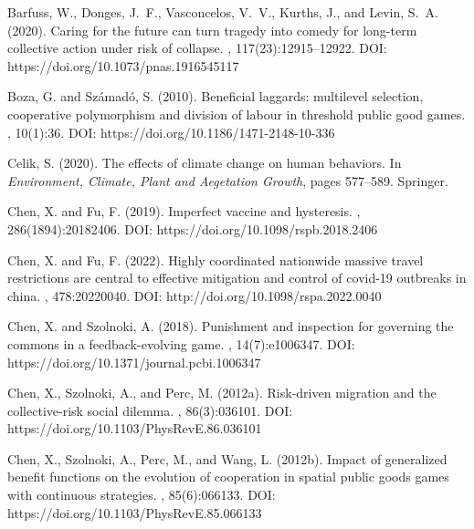 \documentclass[9pt]{elife}
\begin{document}
\begin{thebibliography}{}

Barfuss, W., Donges, J.~F., Vasconcelos, V.~V., Kurths, J., and Levin, S.~A.
  (2020).
\newblock Caring for the future can turn tragedy into comedy for long-term
  collective action under risk of collapse.
, 117(23):12915--12922. DOI: https://doi.org/10.1073/pnas.1916545117

Boza, G. and Sz{\'a}mad{\'o}, S. (2010).
\newblock Beneficial laggards: multilevel selection, cooperative polymorphism
  and division of labour in threshold public good games.
, 10(1):36. DOI: https://doi.org/10.1186/1471-2148-10-336

Celik, S. (2020).
\newblock The effects of climate change on human behaviors.
\newblock In {\em Environment, Climate, Plant and Aegetation Growth}, pages
  577--589. Springer.

Chen, X. and Fu, F. (2019).
\newblock Imperfect vaccine and hysteresis.
,
  286(1894):20182406. DOI: https://doi.org/10.1098/rspb.2018.2406

Chen, X. and Fu, F. (2022).
\newblock Highly coordinated nationwide massive travel restrictions are central
  to effective mitigation and control of covid-19 outbreaks in china.
, 478:20220040. DOI: http://doi.org/10.1098/rspa.2022.0040

Chen, X. and Szolnoki, A. (2018).
\newblock Punishment and inspection for governing the commons in a
  feedback-evolving game.
, 14(7):e1006347. DOI: https://doi.org/10.1371/journal.pcbi.1006347

Chen, X., Szolnoki, A., and Perc, M. (2012a).
\newblock Risk-driven migration and the collective-risk social dilemma.
, 86(3):036101. DOI: https://doi.org/10.1103/PhysRevE.86.036101

Chen, X., Szolnoki, A., Perc, M., and Wang, L. (2012b).
\newblock Impact of generalized benefit functions on the evolution of
  cooperation in spatial public goods games with continuous strategies.
, 85(6):066133. DOI: https://doi.org/10.1103/PhysRevE.85.066133


\end{thebibliography}
\end{document}
